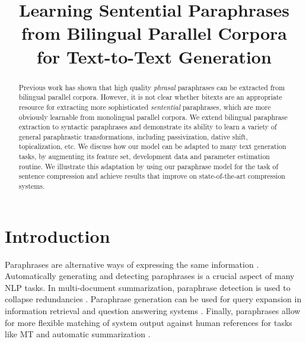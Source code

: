 \documentclass[11pt]{article}
\title{Learning Sentential Paraphrases from Bilingual Parallel Corpora
  \\ for Text-to-Text Generation}
\date{}
\begin{document}
\maketitle

\begin{abstract}
  Previous work has shown that high quality {\it phrasal} paraphrases
  can be extracted from bilingual parallel corpora.  However, it is
  not clear whether bitexts are an appropriate resource for extracting
  more sophisticated {\it sentential} paraphrases, which are more
  obviously learnable from monolingual parallel corpora.  We extend
  bilingual paraphrase extraction to syntactic paraphrases and
  demonstrate its ability to learn a variety of general paraphrastic
  transformations, including passivization, dative shift,
  topicalization, etc.  We discuss how our model can be adapted to
  many text generation tasks, by augmenting its feature set,
  development data and parameter estimation routine.  We illustrate
  this adaptation by using our paraphrase model for the task of sentence compression and achieve results that improve on state-of-the-art compression systems.
\end{abstract}

\section{Introduction} \label{introduction}

Paraphrases are alternative ways of expressing the same information
\cite{Culicover1968}.  Automatically generating and detecting
paraphrases is a crucial aspect of many NLP tasks.  In multi-document
summarization, paraphrase detection is used to collapse redundancies
\cite{Barzilay1999,BarzilayThesis}. Paraphrase generation can be used
for query expansion in information retrieval and question answering
systems
\cite{mckeown:1979:ACL,Anick1999,Ravichandran2002,Riezler2007}.
Finally, paraphrases allow for more flexible matching of system output
against human references for tasks like MT and
automatic summarization
\cite{Zhou2006b,Kauchak2006,Madnani2007,Snover2010}.\nocite{Owczarzak2006}
\end{document}
